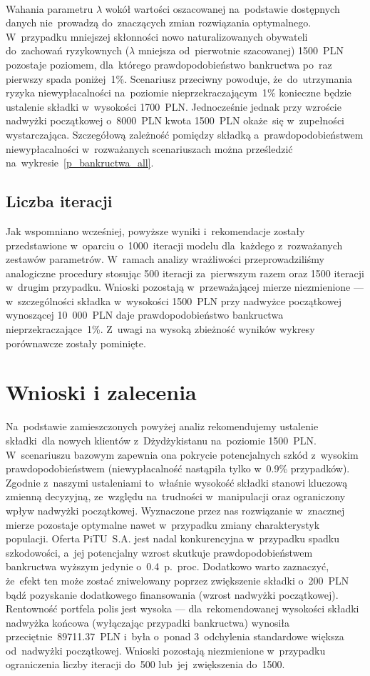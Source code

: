 \documentclass[12pt, a4paper, oneside]{mwart} %
\begin{document}
\paragraph{}
Wahania parametru $\lambda$ wokół wartości oszacowanej na~podstawie dostępnych danych nie~prowadzą do~znaczących zmian rozwiązania optymalnego. W~przypadku mniejszej skłonności nowo naturalizowanych obywateli do~zachowań ryzykownych ($\lambda$ mniejsza od~pierwotnie szacowanej) 1500~PLN pozostaje poziomem, dla~którego prawdopodobieństwo bankructwa po~raz pierwszy spada poniżej~1\%. Scenariusz przeciwny powoduje, że~do~utrzymania ryzyka niewypłacalności na~poziomie nieprzekraczającym~1\% konieczne będzie ustalenie składki w~wysokości 1700~PLN. Jednocześnie jednak przy wzroście nadwyżki początkowej o~8000~PLN kwota 1500~PLN okaże~się w~zupełności wystarczająca. Szczegółową zależność pomiędzy składką a~prawdopodobieństwem niewypłacalności w~rozważanych scenariuszach można prześledzić na~wykresie~\ref{p_bankructwa_all}.

\subsection{Liczba iteracji}
Jak wspomniano wcześniej, powyższe wyniki i~rekomendacje zostały przedstawione w~oparciu o~1000~iteracji modelu dla~każdego z~rozważanych zestawów parametrów. W~ramach analizy wrażliwości przeprowadziliśmy analogiczne procedury stosując 500 iteracji za~pierwszym razem oraz 1500 iteracji w~drugim przypadku. Wnioski pozostają w~przeważającej mierze niezmienione --- w~szczególności składka w~wysokości 1500~PLN przy nadwyżce początkowej wynoszącej 10~000~PLN daje prawdopodobieństwo bankructwa nieprzekraczające~1\%. Z~uwagi na wysoką zbieżność wyników wykresy porównawcze zostały pominięte.

\section{Wnioski i zalecenia}
Na~podstawie zamieszczonych powyżej analiz rekomendujemy ustalenie składki~dla nowych klientów z~Dżydżykistanu na~poziomie 1500~PLN. W~scenariuszu bazowym zapewnia ona pokrycie potencjalnych szkód z~wysokim prawdopodobieństwem (niewypłacalność nastąpiła tylko w~0.9\% przypadków). Zgodnie z~naszymi ustaleniami to~właśnie wysokość składki stanowi kluczową zmienną decyzyjną, ze~względu na~trudności w~manipulacji oraz ograniczony wpływ nadwyżki początkowej. Wyznaczone przez nas rozwiązanie w~znacznej mierze pozostaje optymalne nawet w~przypadku zmiany charakterystyk populacji. Oferta PiTU~S.A. jest nadal konkurencyjna w~przypadku spadku szkodowości, a~jej potencjalny wzrost skutkuje prawdopodobieństwem bankructwa wyższym jedynie o~0.4~p.~proc. Dodatkowo warto zaznaczyć, że~efekt ten może zostać zniwelowany poprzez zwiększenie składki o~200~PLN bądź pozyskanie dodatkowego finansowania (wzrost nadwyżki początkowej). Rentowność portfela polis jest wysoka --- dla~rekomendowanej wysokości składki nadwyżka końcowa (wyłączając przypadki bankructwa) wynosiła przeciętnie~89711.37~PLN i~była o~ponad 3~odchylenia standardowe większa od~nadwyżki początkowej. Wnioski pozostają niezmienione w~przypadku ograniczenia liczby iteracji do~500 lub~jej~zwiększenia do~1500.
\end{document}
